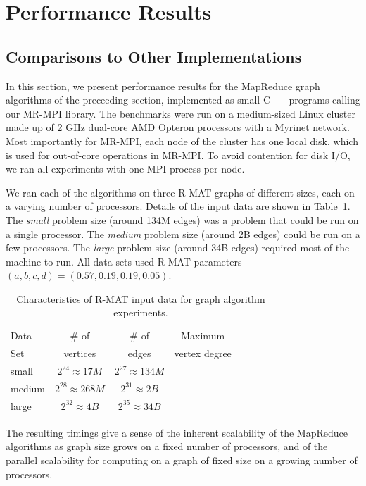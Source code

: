 \section{Performance Results}
\label{sec:results}

\subsection{Comparisons to Other Implementations}

In this section, we present performance results for the MapReduce
graph algorithms of the preceeding section, implemented as small C++
programs calling our MR-MPI library.
The benchmarks were run on a medium-sized Linux cluster made up of 2 GHz
dual-core AMD Opteron processors with a Myrinet network.  Most importantly
for MR-MPI, each node of the cluster has one local disk, which is used
for out-of-core operations in MR-MPI.  To avoid contention for disk I/O, we 
ran all experiments with one MPI process per node.

We ran each of the algorithms on three R-MAT graphs of
different sizes, each on a varying number of processors.  Details of the
input data are shown in Table~\ref{t:rmats}.
The {\it small} problem size (around 134M edges) was a 
problem that could be run
on a single processor.  The {\it medium} problem size (around 2B
edges) could be run on a few processors.  The {\it large} problem size
(around 34B edges) required most of the machine to run.
All data sets used R-MAT parameters $(a, b, c, d) = (0.57, 0.19, 0.19, 0.05)$.

\begin{table}
\begin{tabular}{|l|c|c|c|c|c|c|c|}
\hline
Data & \# of    & \# of & Maximum \\
Set  & vertices & edges & vertex degree\\
\hline
small  &$2^{24} \approx 17M$ & $2^{27} \approx 134M$ &   \\
medium &$2^{28} \approx 268M$ & $2^{31} \approx 2B$&   \\
large  &$2^{32} \approx 4B$ & $2^{35} \approx 34B$ &   \\
\hline
\end{tabular}
\caption{Characteristics of R-MAT input data for graph algorithm
experiments.}
\label{t:rmats}
\end{table}

The resulting timings give a sense of the inherent scalability of the
MapReduce algorithms as graph size grows on a fixed number of
processors, and of the parallel scalability for computing on a graph
of fixed size on a growing number of processors.

